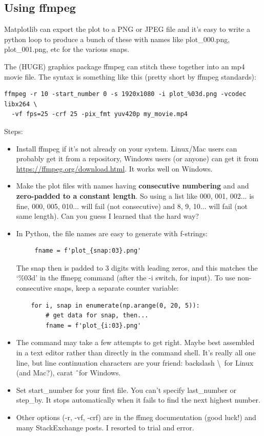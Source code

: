 \subsection{Using ffmpeg}

Matplotlib can export the plot to a PNG or JPEG file and it's easy to write a python loop to produce a bunch of these with names like plot\_000.png, plot\_001.png, etc for the various snaps.

The (HUGE) graphics package ffmpeg can stitch these together into an mp4 movie file. The syntax is something like this (pretty short by ffmpeg standards):

\begin{lstlisting}
ffmpeg -r 10 -start_number 0 -s 1920x1080 -i plot_%03d.png -vcodec libx264 \
  -vf fps=25 -crf 25 -pix_fmt yuv420p my_movie.mp4
\end{lstlisting}

Steps:

\begin{itemize}
	\item Install ffmpeg if it's not already on your system. Linux/Mac users can probably get it from a repository, Windows users (or anyone) can get it from \url{https://ffmpeg.org/download.html}. It works well on Windows.
	\item Make the plot files with names having \textbf{consecutive numbering} and and \textbf{zero-padded to a constant length}. So using a list like 000, 001, 002... is fine, 000, 005, 010... will fail (not consecutive) and 8, 9, 10... will fail (not same length). Can you guess I learned that the hard way? 
	\item In Python, the file names are easy to generate with f-strings:
	\begin{lstlisting}
	 fname = f'plot_{snap:03}.png'
	\end{lstlisting}
	The snap then is padded to 3 digits with leading zeros, and this matches the `\%03d' in the ffmepg command (after the -i switch, for input). To use non-consecutive snaps, keep a separate counter variable:
	\begin{lstlisting}
	for i, snap in enumerate(np.arange(0, 20, 5)):
		# get data for snap, then...
		fname = f'plot_{i:03}.png'	
	\end{lstlisting}
	
	\item The command may take a few attempts to get right. Maybe best assembled in a text editor rather than directly in the command shell. It's really all one line, but line continuation characters are your friend: backslash \textbackslash\ for Linux (and Mac?), carat \^\ for Windows.
	\item Set start\_number for your first file. You can't specify last\_number or step\_by. It stops automatically when it fails to find the next highest number.
	\item Other options (-r, -vf, -crf) are in the ffmeg documentation (good luck!) and many StackExchange posts. I resorted to trial and error.
\end{itemize}

